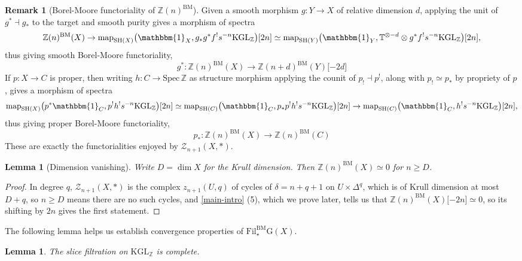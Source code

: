 \documentclass[11pt, twoside]{article}
\numberwithin{equation}{section}
\newtheorem{lemma}[equation]{Lemma}
\theoremstyle{definition}
\newtheorem{remark}[equation]{Remark}
\newcommand{\bb}[1]{\mathbb{#1}}
\newcommand{\spec}{\mathrm{Spec} \,}
\newcommand{\map}{\mathrm{map}}
\newcommand{\fil}{\mathrm{Fil}}
\newcommand{\Kgl}{\mathrm{KGL}}
\newcommand{\sh}{\mathrm{SH}}
\newcommand{\bm}{\mathrm{BM}}
\newcommand{\G}{\mathrm{G}}
\begin{document}
\begin{remark}[Borel-Moore functoriality of \(\bb{Z}(n)^\bm\)]
Given a smooth morphism \(g \colon Y \to X\) of relative dimension \(d\), applying the unit of \(g^* \dashv g_*\) to the target and smooth purity gives a morphism of spectra 
\[\bb{Z}(n)^\bm(X) \to \map_{\sh(X)}\big(\mathbbm{1}_X, g_*g^*f^! s^{- n} \Kgl_\bb{Z}\big)\lbrack 2n \rbrack \simeq \map_{\sh(Y)}\big(\mathbbm{1}_Y, \bb{T}^{\otimes - d} \otimes g^* f^!s^{- n}\Kgl_\bb{Z}\big) \lbrack 2n \rbrack,\]
thus giving smooth Borel-Moore functoriality,
\[g^* \colon \bb{Z}(n)^\bm(X) \to \bb{Z}(n + d)^\bm(Y) \lbrack -2d \rbrack\]
If \(p \colon X \to C\) is proper, then writing \(h \colon C \to \spec \bb{Z}\) as structure morphism applying the counit of \(p_! \dashv p^!\), along with \(p_! \simeq p_*\) by propriety of \(p\), gives a morphism of spectra 
\[\map_{\sh(X)}\big(p^*\mathbbm{1}_C, p^!h^! s^{- n} \Kgl_\bb{Z}\big)\lbrack 2n \rbrack \simeq \map_{\sh(C)}\big(\mathbbm{1}_C, p_*p^!h^! s^{- n} \Kgl_\bb{Z}\big)\lbrack 2n \rbrack \to \map_{\sh(C)}\big(\mathbbm{1}_C, h^! s^{- n}\Kgl_\bb{Z}\big)\lbrack 2n \rbrack,\]
thus giving proper Borel-Moore functoriality, 
\[p_* \colon \bb{Z}(n)^\bm(X) \to \bb{Z}(n)^\bm(C)\]
These are exactly the functorialities enjoyed by \(\mathcal{Z}_{n + 1}(X, *)\).
\end{remark}

\begin{lemma}[Dimension vanishing]\label{lemm:dim-van}
Write \(D = \dim X\) for the Krull dimension. Then \(\bb{Z}(n)^\bm(X) \simeq 0\) for \(n \geq D\).
\end{lemma}

\begin{proof}
In degree \(q\), \(\mathcal{Z}_{n + 1}(X, *)\) is the complex \(z_{n + 1}(U, q)\) of cycles of \(\delta = n + q + 1\) on \(U \times \Delta^q\), which is of Krull dimension at most \(D + q\), so \(n \geq D\) means there are no such cycles, and \ref{main-intro} (5), which we prove later, tells us that \(\bb{Z}(n)^\bm(X) \lbrack -2n \rbrack \simeq 0\), so its shifting by \(2n\) gives the first statement.\end{proof}

The following lemma helps us establish convergence properties of \(\fil_\star^\bm \G(X)\).

\begin{lemma}\label{lemm:comp:KGL}
The slice filtration on \(\Kgl_\bb{Z}\) is complete.
\end{lemma}
\end{document}
